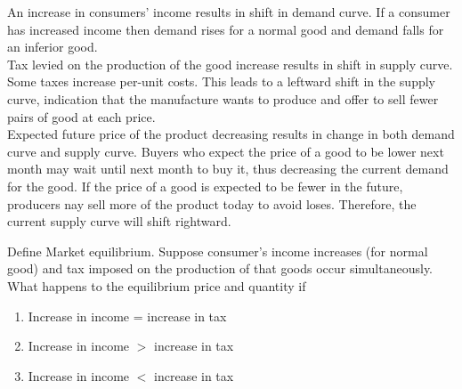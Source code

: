 \documentclass[12pt]{article}
\begin{document}
\begin{soln}
	An increase in consumers' income results in shift in demand curve. If a consumer has increased income then demand rises for a normal good and demand falls for an inferior good.\\


	Tax levied on the production of the good increase results in shift in supply curve. Some taxes increase per-unit costs. This leads to a leftward shift in the supply curve, indication that the manufacture wants to produce and offer to sell fewer pairs of good at each price.\\


	Expected future price of the product decreasing results in change in both demand curve and supply curve. Buyers who expect the price of a good to be lower next month may wait until next month to buy it, thus decreasing the current demand for the good. If the price of a good is expected to be fewer in the future, producers nay sell more of the product today to avoid loses. Therefore, the current supply curve will shift rightward.

\end{soln}
\newpage
\begin{prob}
	Define Market equilibrium. Suppose consumer's income increases (for normal good) and tax imposed on the production of that goods occur simultaneously. What happens to the equilibrium price and quantity if
	\begin{enumerate}[label=(\alph*)]
		\item Increase in income = increase in tax
		\item Increase in income $ > $ increase in tax
		\item Increase in income $ < $ increase in tax
	\end{enumerate}
\end{prob}
\end{document}
